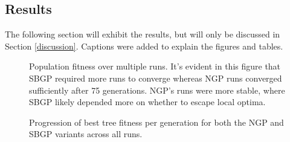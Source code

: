 \documentclass{article}
\begin{document}
\newpage

\subsection{Results}
The following section will exhibit the results, but will only be discussed in Section \ref{discussion}. Captions were added to explain the figures and tables.
\begin{figure}[H]
  \caption{Population fitness over multiple runs. It's evident in this figure that SBGP required more runs to converge whereas NGP runs converged sufficiently after 75 generations. NGP's runs were more stable, where SBGP likely depended more on whether to escape local optima.}
  \label{fig:gpPopResults}
\end{figure}

\begin{figure}[H]
  \caption{Progression of best tree fitness per generation for both the NGP and SBGP variants across all runs.}
  \label{fig:gpBestResults}
\end{figure}
\end{document}
